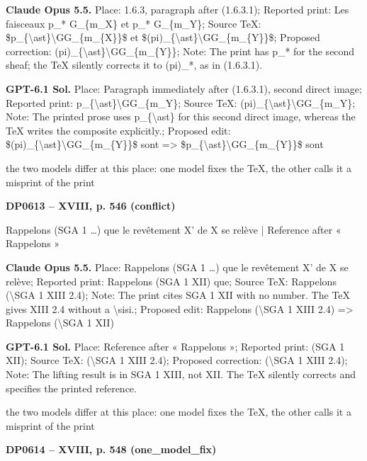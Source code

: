 \textbf{Claude Opus 5.5.} Place: 1.6.3, paragraph after (1.6.3.1); Reported print: Les faisceaux p\_* G\_\{m\_X\} et p\_* G\_\{m\_Y\}; Source TeX: \$p\_\{\textbackslash{}ast\}\textbackslash{}GG\_\{m\_\{X\}\}\$ et \$(pi)\_\{\textbackslash{}ast\}\textbackslash{}GG\_\{m\_\{Y\}\}\$; Proposed correction: (pi)\_\{\textbackslash{}ast\}\textbackslash{}GG\_\{m\_\{Y\}\}; Note: The print has p\_* for the second sheaf; the TeX silently corrects it to (pi)\_*, as in (1.6.3.1).\par
\textbf{GPT-6.1 Sol.} Place: Paragraph immediately after (1.6.3.1), second direct image; Reported print: p\_\{\textbackslash{}ast\}\textbackslash{}GG\_\{m\_Y\}; Source TeX: (pi)\_\{\textbackslash{}ast\}\textbackslash{}GG\_\{m\_Y\}; Note: The printed prose uses p\_\{\textbackslash{}ast\} for this second direct image, whereas the TeX writes the composite explicitly.; Proposed edit: \$(pi)\_\{\textbackslash{}ast\}\textbackslash{}GG\_\{m\_\{Y\}\}\$ sont =\allowbreak > \$p\_\{\textbackslash{}ast\}\textbackslash{}GG\_\{m\_\{Y\}\}\$ sont\par
the two models differ at this place: one model fixes the TeX, the other calls it a misprint of the print\par
\par\noindent\hypertarget{DP0613}{}\textbf{DP0613 -- XVIII, p. 546 (conflict)}\par
Rappelons (SGA 1 …) que le revêtement X' de X se relève | Reference after « Rappelons »\par
\textbf{Claude Opus 5.5.} Place: Rappelons (SGA 1 …) que le revêtement X' de X se relève; Reported print: Rappelons (SGA 1 XII) que; Source TeX: Rappelons (\textbackslash{}SGA 1 XIII 2.4); Note: The print cites SGA 1 XII with no number. The TeX gives XIII 2.4 without a \textbackslash{}sisi.; Proposed edit: Rappelons (\textbackslash{}SGA 1 XIII 2.4) =\allowbreak > Rappelons (\textbackslash{}SGA 1 XII)\par
\textbf{GPT-6.1 Sol.} Place: Reference after « Rappelons »; Reported print: (SGA 1 XII); Source TeX: (\textbackslash{}SGA 1 XIII 2.4); Proposed correction: (\textbackslash{}SGA 1 XIII 2.4); Note: The lifting result is in SGA 1 XIII, not XII. The TeX silently corrects and specifies the printed reference.\par
the two models differ at this place: one model fixes the TeX, the other calls it a misprint of the print\par
\par\noindent\hypertarget{DP0614}{}\textbf{DP0614 -- XVIII, p. 548 (one\_model\_fix)}\par
